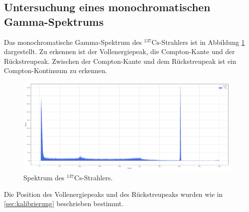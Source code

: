 \subsection{Untersuchung eines monochromatischen Gamma-Spektrums}
Das monochromatische Gamma-Spektrum des $^{137}\text{Cs}$-Strahlers ist in Abbildung \ref{fig:cs} dargestellt.
Zu erkennen ist der Vollenergiepeak, die Compton-Kante und der Rückstreupeak. 
Zwischen der Compton-Kante und dem Rückstreupeak ist ein Compton-Kontinuum zu erkennen.

\begin{figure}[H]
  \centering
  \includegraphics[width=\textwidth]{../plots/Caesium-Peaks.pdf}
  \caption{Spektrum des $^{137}\text{Cs}$-Strahlers.}
  \label{fig:cs}
\end{figure}

Die Position des Vollenergiepeaks und des Rückstreupeaks wurden wie in \ref{sec:kalibrierung} beschrieben bestimmt.

